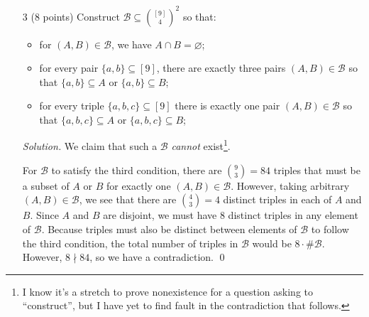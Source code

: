 \documentclass[11pt,letterpaper,dvipsnames]{article}
\newenvironment{solution}{\color{BlueViolet}\textit{Solution.}}{\color{black}}
\begin{document}
\begin{enumerate}
	\item[3] (8 points) Construct
$
\mathcal{B} \subseteq \binom{[9]}{4}^2
$
	so that:
	\begin{itemize}
		\item for $(A,B) \in \mathcal{B}$, we have $A \cap B = \varnothing$;
		\item 
		for every pair $\{a,b\} \subseteq [9]$, there are exactly three pairs $(A,B) \in \mathcal{B}$ so that $\{a,b\}\subseteq A$ or $\{a,b\}\subseteq B$;
		\item for every triple $\{a,b,c\} \subseteq [9]$ there is exactly one pair $(A,B) \in \mathcal{B}$ so that $\{a,b,c\} \subseteq A$ or $\{a,b,c\} \subseteq B$;
	\end{itemize}

\begin{solution}
	We claim that such a $\mathcal{B}$ \textit{cannot} exist\footnote{I know it's a stretch to prove nonexistence for a question asking to ``construct'', but I have yet to find fault in the contradiction that follows.}.
	
	For $\mathcal{B}$ to satisfy the third condition, there are $\binom{9}{3}=84$ triples that must be a subset of $A$ or $B$ for exactly one $(A,B) \in \mathcal{B}$. However, taking arbitrary $(A,B) \in \mathcal{B}$, we see that there are $\binom{4}{3}=4$ distinct triples in each of $A$ and $B$. Since $A$ and $B$ are disjoint, we must have $8$ distinct triples in any element of $\mathcal{B}$. Because triples must also be distinct between elements of $\mathcal{B}$ to follow the third condition, the total number of triples in $\mathcal{B}$ would be $8\cdot \#\mathcal{B}$. However, $8\nmid 84$, so we have a contradiction. \qed

	
\end{solution}

\end{enumerate}
\end{document}

